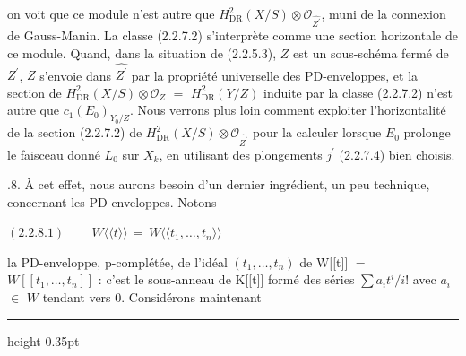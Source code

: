 \documentclass[9pt]{article}
\newcommand{\CanonText}[1]{\par{\fontsize{8.0}{9.35}\selectfont\RaggedRight #1\par}\vspace{2.2pt}}
\newcommand{\CanonDisplay}[1]{\par\vspace{1.2pt}\begin{center}{\fontsize{7.2}{8.4}\selectfont\(\displaystyle #1\)}\end{center}\vspace{1.2pt}}
\begin{document}
\begin{minipage}[t][\dimexpr\textheight-5pt\relax][t]{\textwidth}
\CanonText{on voit que ce module n'est autre que \(H^{2}_{\mathrm{DR}}(X/S)\otimes{}\mathcal{O}_{\widehat{Z^{\prime}}}\), muni de la connexion de Gauss-Manin. La classe (2.2.7.2) s'interprète comme une section horizontale de ce module. Quand, dans la situation de (2.2.5.3), \(Z\) est un sous-schéma fermé de \(Z^{\prime}\), \(Z\) s'envoie dans \(\widehat{Z^{\prime}}\) par la propriété universelle des PD-enveloppes, et la section de \(H^{2}_{\mathrm{DR}}(X/S)\otimes{}\mathcal{O}_{Z}\) \(=\) \(H^{2}_{\mathrm{DR}}(Y/Z)\) induite par la classe (2.2.7.2) n'est autre que \(c_{1}(E_{0})_{Y_{0}/Z}\). Nous verrons plus loin comment exploiter l'horizontalité de la section (2.2.7.2) de \(H^{2}_{\mathrm{DR}}(X/S)\otimes{}\mathcal{O}_{\widehat{Z^{\prime}}}\) pour la calculer lorsque \(E_{0}\) prolonge le faisceau donné \(L_{0}\) sur \(X_{k}\), en utilisant des plongements \(j^{\prime}\) (2.2.7.4) bien choisis.}
\CanonText{2.2.8. À cet effet, nous aurons besoin d'un dernier ingrédient, un peu technique, concernant les PD-enveloppes. Notons}
\CanonDisplay{(2.2.8.1)\qquad\,W\langle{}\langle{}t\rangle{}\rangle{}\,=\,W\langle{}\langle{}t_{1},\ldots{},t_{n}\rangle{}\rangle{}}
\CanonText{la PD-enveloppe, p-complétée, de l'idéal \((t_{1},\ldots{},t_{n})\) de W[[t]] \(=\) \(W[[t_{1},\ldots{},t_{n}]]\) : c'est le sous-anneau de K[[t]] formé des séries \(\sum{}a_{i}t^{i}/i\)! avec \(a_{i}\) \(\in{}\) \(W\) tendant vers 0. Considérons maintenant}
\vfill
{\color{Accent}\hrule height 0.35pt}\vspace{3pt}
\end{minipage}
\newpage
\end{document}
